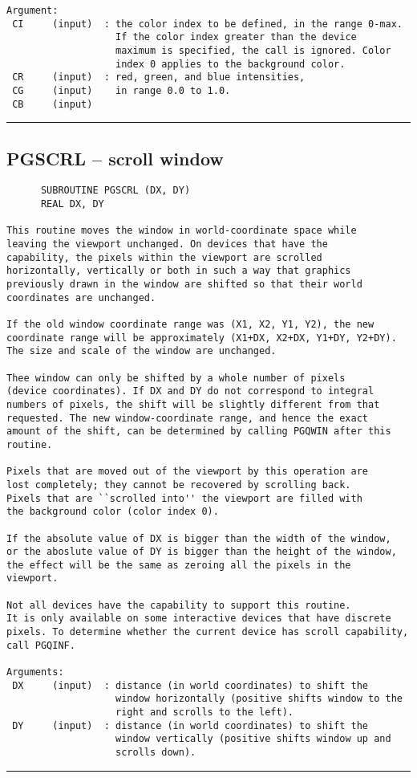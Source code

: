 {\begin{verbatim}
Argument:
 CI     (input)  : the color index to be defined, in the range 0-max.
                   If the color index greater than the device
                   maximum is specified, the call is ignored. Color
                   index 0 applies to the background color.
 CR     (input)  : red, green, and blue intensities,
 CG     (input)    in range 0.0 to 1.0.
 CB     (input)
\end{verbatim}
\hrule


\subsection*{PGSCRL -- scroll window }
\begin{verbatim}
      SUBROUTINE PGSCRL (DX, DY)
      REAL DX, DY

This routine moves the window in world-coordinate space while
leaving the viewport unchanged. On devices that have the
capability, the pixels within the viewport are scrolled
horizontally, vertically or both in such a way that graphics
previously drawn in the window are shifted so that their world
coordinates are unchanged.

If the old window coordinate range was (X1, X2, Y1, Y2), the new
coordinate range will be approximately (X1+DX, X2+DX, Y1+DY, Y2+DY).
The size and scale of the window are unchanged.

Thee window can only be shifted by a whole number of pixels
(device coordinates). If DX and DY do not correspond to integral
numbers of pixels, the shift will be slightly different from that
requested. The new window-coordinate range, and hence the exact
amount of the shift, can be determined by calling PGQWIN after this
routine.

Pixels that are moved out of the viewport by this operation are
lost completely; they cannot be recovered by scrolling back.
Pixels that are ``scrolled into'' the viewport are filled with
the background color (color index 0).

If the absolute value of DX is bigger than the width of the window,
or the aboslute value of DY is bigger than the height of the window,
the effect will be the same as zeroing all the pixels in the
viewport.

Not all devices have the capability to support this routine.
It is only available on some interactive devices that have discrete
pixels. To determine whether the current device has scroll capability,
call PGQINF.

Arguments:
 DX     (input)  : distance (in world coordinates) to shift the
                   window horizontally (positive shifts window to the
                   right and scrolls to the left).
 DY     (input)  : distance (in world coordinates) to shift the
                   window vertically (positive shifts window up and
                   scrolls down).
\end{verbatim}
\hrule


}

